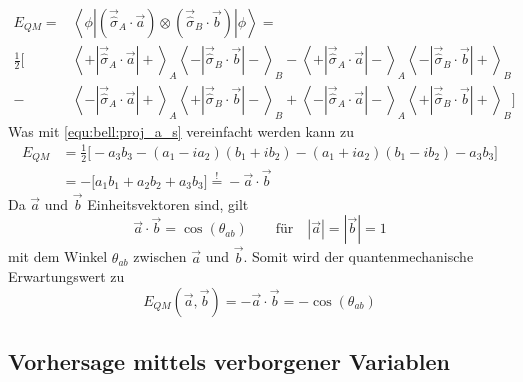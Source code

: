 \begin{refsection}
\begin{equation} 
\begin{split}
   E_{QM }=&\left\langle \phi \left| 
       \left( \vec{\hat{\sigma}}_A \cdot \vec{a} \right)
               \otimes \left( \vec{\hat{\sigma}}_B \cdot \vec{b} \right)
       \right| \phi \right\rangle
    = \\
    \frac{1}{2}\Bigg[ &
        \left\langle{+}\left| \vec{\hat{\sigma}}_A \cdot \vec{a} \right|{+}\right\rangle_A
        \left\langle{-}\left| \vec{\hat{\sigma}}_B \cdot \vec{b} \right|{-}\right\rangle_B
        -
        \left\langle{+}\left| \vec{\hat{\sigma}}_A \cdot \vec{a} \right|{-}\right\rangle_A
        \left\langle{-}\left| \vec{\hat{\sigma}}_B \cdot \vec{b} \right|{+}\right\rangle_B \\
        - &
        \left\langle{-}\left| \vec{\hat{\sigma}}_A \cdot \vec{a} \right|{+}\right\rangle_A
        \left\langle{+}\left| \vec{\hat{\sigma}}_B \cdot \vec{b} \right|{-}\right\rangle_B
        +
        \left\langle{-}\left| \vec{\hat{\sigma}}_A \cdot \vec{a} \right|{-}\right\rangle_A
        \left\langle{+}\left| \vec{\hat{\sigma}}_B \cdot \vec{b} \right|{+}\right\rangle_B
    \Bigg]
\end{split}
\end{equation}
Was mit \eqref{equ:bell:proj_a_s} vereinfacht werden kann zu
\begin{equation}\label{equ:bell:e_qm}
\begin{split}
    E_{QM} &= \frac{1}{2} \big[ -a_3b_3 - (a_1-ia_2)(b_1+ib_2) - (a_1+ia_2)(b_1-ib_2) - a_3b_3 \big] \\
    &= -\big[ a_1b_1 + a_2b_2 + a_3b_3 \big] \stackrel{!}{=} -\vec{a} \cdot \vec{b}
\end{split}
\end{equation}
Da $\vec{a}$ und $\vec{b}$ Einheitsvektoren sind, gilt
\begin{equation}
    \vec{a} \cdot \vec{b} = \cos(\theta_{ab}) \qquad \text{f\"ur} \quad |\vec{a}| = |\vec{b}| = 1
\end{equation}
mit dem Winkel $\theta_{ab}$ zwischen $\vec{a}$ und $\vec{b}$.
Somit wird der quantenmechanische Erwartungswert zu
\begin{equation}
    E_{QM}(\vec{a},\vec{b}) = -\vec{a}\cdot\vec{b} = -\cos(\theta_{ab})
\end{equation}

\subsection{Vorhersage mittels verborgener Variablen}


\end{refsection}
